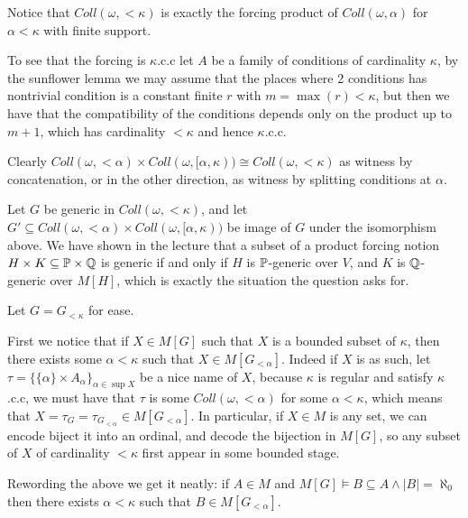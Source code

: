 \begin{cExercise}
	\begin{cPart}
		Notice that $Coll(\omega, <\kappa)$ is exactly the forcing product of $Coll(\omega,\alpha)$ for $\alpha<\kappa$ with finite support.
		
		To see that the forcing is $\kappa$.c.c let $A$ be a family of conditions of cardinality $\kappa$, by the sunflower lemma we may assume that the places where 2 conditions has nontrivial condition is a constant finite $r$ with $m=\max(r)<\kappa$, but then we have that the compatibility of the conditions depends only on the product up to $m+1$, which has cardinality $<\kappa$ and hence $\kappa$.c.c. 
	\end{cPart}
	\begin{cPart}
		Clearly $Coll(\omega,<\alpha)\times Coll(\omega,[\alpha,\kappa))\cong Coll(\omega,<\kappa)$ as witness by concatenation, or in the other direction, as witness by splitting conditions at $\alpha$.
		
		Let $G$ be generic in $Coll(\omega,<\kappa)$, and let $G'\subseteq Coll(\omega,<\alpha)\times Coll(\omega,[\alpha,\kappa))$ be image of $G$ under the isomorphism above. We have shown in the lecture that a subset of a product forcing notion $H\times K\subseteq \P\times\Q$ is generic if and only if $H$ is $\P$-generic over $V$, and $K$ is $\Q$-generic over $M[H]$, which is exactly the situation the question asks for.
	\end{cPart}
	\begin{cPart}
		Let $G=G_{<\kappa}$ for ease.
		
		First we notice that if $X\in M[G]$ such that $X$ is a bounded subset of $\kappa$, then there exists some $\alpha<\kappa$ such that $X\in M[G_{<\alpha}]$. Indeed if $X$ is as such, let $\tau=\{\{\alpha\}\times A_\alpha\}_{\alpha\in \sup X}$ be a nice name of $X$, because $\kappa$ is regular and satisfy $\kappa$.c.c, we must have that $\tau$ is some $Coll(\omega,<\alpha)$ for some $\alpha<\kappa$, which means that $X=\tau_{G}=\tau_{G_{<\alpha}}\in M[G_{<\alpha}]$. In particular, if $X\in M$ is any set, we can encode biject it into an ordinal, and decode the bijection in $M[G]$, so any subset of $X$ of cardinality $<\kappa$ first appear in some bounded stage.
		
		Rewording the above we get it neatly: if $A\in M$ and $M[G]\models B \subseteq A\land |B|=\aleph_0$ then there exists $\alpha<\kappa$ such that $B\in M[G_{<\alpha}]$.
		

\end{cPart}
\end{cExercise}
